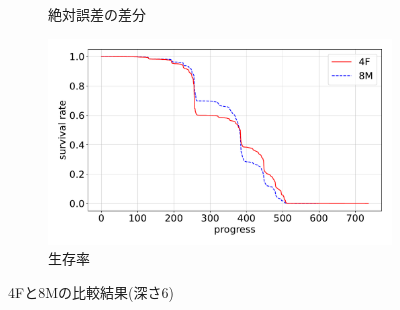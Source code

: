 \begin{figure}[t]
\begin{subfigure}[b]{0.49\linewidth}
    \caption{絶対誤差の差分}
    \label{fig:EXP6_NT4F_and_NT8M_error_abs_diff}
\end{subfigure}
\begin{subfigure}[b]{0.49\linewidth}
    \includegraphics[width=\linewidth]{pdf/compare/EXP6_NT4F_and_NT8M/survival.pdf}
    \caption{生存率}
    \label{figEXP6_:NT4F_and_NT8M_survival}
\end{subfigure}
\caption{4Fと8Mの比較結果(深さ6)}
\label{fig:EXP6_NT4FとNT8M_results}
\end{figure}
    

